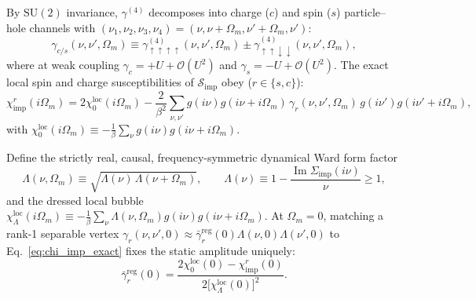 \documentclass[11pt,a4paper]{article}
\numberwithin{equation}{section}
\theoremstyle{plain}
\theoremstyle{definition}
\providecommand{\im}{\operatorname{Im}}
\begin{document}
By $\mathrm{SU}(2)$ invariance, $\gamma^{(4)}$ decomposes into charge ($c$) and spin
($s$) particle--hole channels with
$(\nu_1,\nu_2,\nu_3,\nu_4) = (\nu,\nu+\Omega_m,\nu'+\Omega_m,\nu')$:
\begin{equation}
    \gamma_{c/s}(\nu,\nu',\Omega_m)
    \equiv \gamma^{(4)}_{\uparrow\uparrow\uparrow\uparrow}(\nu,\nu',\Omega_m)
           \pm \gamma^{(4)}_{\uparrow\uparrow\downarrow\downarrow}(\nu,\nu',\Omega_m),
    \label{eq:gamma_cs}
\end{equation}
where at weak coupling $\gamma_c = +U + \mathcal{O}(U^2)$ and
$\gamma_s = -U + \mathcal{O}(U^2)$. The exact local spin and charge susceptibilities
of $\mathcal{S}_{\mathrm{imp}}$ obey ($r \in \{s,c\}$):
\begin{equation}
    \chi_{\mathrm{imp}}^r(i\Omega_m)
    = 2\chi_0^{\mathrm{loc}}(i\Omega_m)
      - \frac{2}{\beta^2} \sum_{\nu,\nu'}
        g(i\nu) g(i\nu+i\Omega_m)\, \gamma_r(\nu,\nu',\Omega_m)\,
        g(i\nu') g(i\nu'+i\Omega_m),
    \label{eq:chi_imp_exact}
\end{equation}
with $\chi_0^{\mathrm{loc}}(i\Omega_m) \equiv -\frac{1}{\beta}\sum_\nu g(i\nu)g(i\nu+i\Omega_m)$.

Define the strictly real, causal, frequency-symmetric dynamical Ward form factor
\begin{equation}
    \Lambda(\nu,\Omega_m) \equiv \sqrt{\Lambda(\nu)\,\Lambda(\nu+\Omega_m)},
    \qquad
    \Lambda(\nu) \equiv 1 - \frac{\im \Sigma_{\mathrm{imp}}(i\nu)}{\nu} \ge 1,
    \label{eq:Lambda_def}
\end{equation}
and the dressed local bubble
$\chi_{\Lambda}^{\mathrm{loc}}(i\Omega_m) \equiv -\frac{1}{\beta}\sum_\nu \Lambda(\nu,\Omega_m)g(i\nu)g(i\nu+i\Omega_m)$.
At $\Omega_m = 0$, matching a rank-1 separable vertex
$\gamma_r(\nu,\nu',0) \approx \bar{\gamma}_r^{\mathrm{reg}}(0)\Lambda(\nu,0)\Lambda(\nu',0)$
to Eq.~\eqref{eq:chi_imp_exact} fixes the static amplitude uniquely:
\begin{equation}
    \bar{\gamma}_r^{\mathrm{reg}}(0)
    = \frac{2\chi_0^{\mathrm{loc}}(0) - \chi_{\mathrm{imp}}^r(0)}
           {2\bigl[\chi_{\Lambda}^{\mathrm{loc}}(0)\bigr]^2}.
    \label{eq:gamma_bar_static}
\end{equation}
\end{document}
